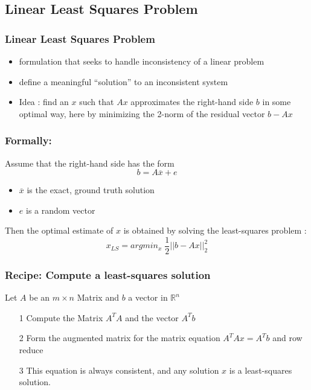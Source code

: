 \documentclass{beamer}
\begin{document}
\subsection{Linear Least Squares Problem}

\begin{frame}
	\frametitle{Linear Least Squares Problem}
	\begin{itemize}
		\item formulation that seeks to handle inconsistency of a linear problem
		\item define a meaningful “solution” to an inconsistent system
		 \pause
		\item Idea : find an $x$ such that $ Ax$ approximates the right-hand side $b$ in some optimal way, here by minimizing the 2-norm of the residual vector $b -Ax$
	\end{itemize}
\end{frame}
\begin{frame}
	\frametitle{Formally:}
	Assume that the right-hand side has the form 
	$$ b = A\overline{x} + e$$
	\begin{itemize}
		\item $\overline{x}$ is the exact, ground truth solution
		\item $e$ is a random vector
		
	\end{itemize}
		 \pause
Then the optimal estimate of $x$ is obtained by solving the least-squares problem :
	$$x_{LS} = argmin_{x} \; \frac{1}{2} ||b - Ax||_{2}^{2} $$
\end{frame}
\begin{frame}
	\frametitle{Recipe: Compute a least-squares solution}
	Let $A$ be an $m \times n$ Matrix and $b$ a vector in $ \mathbb{R}^{n}$ 
	\begin{enumerate}
		\item[1] Compute the Matrix $A^{T}A$ and the vector $A^{T}b$ 
		 \pause
		\item[2] Form the augmented matrix for the matrix equation $A^{T}Ax = A^{T}b$ and row reduce
		 \pause
		\item[3] This equation is always consistent, and any solution $x$ is a least-squares solution.
	\end{enumerate}
\end{frame}
\end{document}
